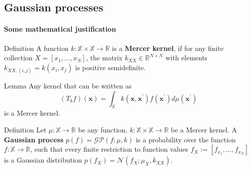 \subsection{Gaussian processes}
\begin{frame}{\insertsubsection}
    \framesubtitle{Some mathematical justification}

    \begin{block}{Definition}
        A function $k:\mathbb{X}\times\mathbb{X} \rightarrow \mathbb{R}$ is a \textcolor{UniBlue}{\textbf{Mercer kernel}}, if for any finite collection $X=\left[x_{1}, \dots, x_{N}\right]$, the matrix $k_{X X} \in \mathbb{R}^{N \times N}$ with elements $k_{X X,(i, j)}=k\left(x_{i}, x_{j}\right)$ is positive semidefinite.
    \end{block}
    
    \begin{block}{Lemma}
        Any kernel that can be written as
        \begin{equation*}
            \left(T_{k} f\right)(\mathbf{x})=\int_{\mathbb{X}} k\left(\mathbf{x}, \mathbf{x}^{\prime}\right) f\left(\mathbf{x}^{\prime}\right) d \mu\left(\mathbf{x}^{\prime}\right)
        \end{equation*}
        is a Mercer kernel.
    \end{block}

    \begin{block}{Definition}
        Let $\mu:\mathbb{X}\rightarrow \mathbb{R}$ be any function, $k:\mathbb{X}\times\mathbb{X} \rightarrow \mathbb{R}$ be a Mercer kernel. A \textcolor{UniBlue}{\textbf{Gaussian process}} $p(f)=\mathcal{G} \mathcal{P}(f ; \mu, k)$ is a probability over the function $f : \mathbb{X} \rightarrow \mathbb{R}$, such that every finite restriction to function values $f_{X} :=\left[f_{x_{1}}, \ldots, f_{x_{N}}\right]$ is a Gaussian distribution $p\left(f_{X}\right)=\mathcal{N}\left(f_{X} ; \mu_{X}, k_{X X}\right)$.
    \end{block}



\end{frame}
